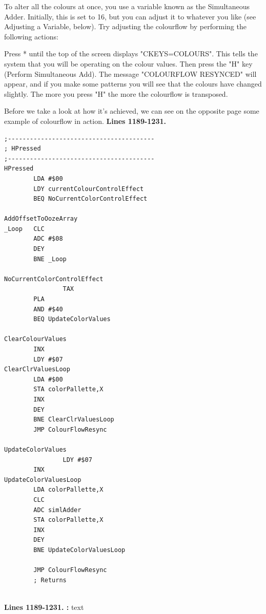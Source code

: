 \begin{definition}
To alter all the colours at once, you use a variable known as the Simultaneous
Adder.  Initially, this is set to 16, but you can adjust it to whatever you
like (see Adjusting a Variable, below).  Try adjusting the colourflow by
performing the following actions:

Press * until the top of the screen displays "CKEYS=COLOURS".  This tells the
system that you will be operating on the colour values.  Then press the "H" key
(Perform Simultaneous Add).  The message "COLOURFLOW RESYNCED" will appear, and
if you make some patterns you will see that the colours have changed slightly.
  The more you press "H" the more the colourflow is transposed.

\end{definition}
\clearpage


\clearpage
Before we take a look at how it's achieved, we can see on the opposite page
some example of colourflow in action.
\clearpage
\textbf{Lines 1189-1231. } 
\begin{lstlisting}
;----------------------------------------
; HPressed   
;----------------------------------------
HPressed   
        LDA #$00
        LDY currentColourControlEffect
        BEQ NoCurrentColorControlEffect

AddOffsetToOozeArray
_Loop   CLC 
        ADC #$08
        DEY 
        BNE _Loop

NoCurrentColorControlEffect   
				TAX 
        PLA 
        AND #$40
        BEQ UpdateColorValues

ClearColourValues
        INX 
        LDY #$07
ClearClrValuesLoop   
        LDA #$00
        STA colorPallette,X
        INX 
        DEY 
        BNE ClearClrValuesLoop
        JMP ColourFlowResync

UpdateColorValues   
				LDY #$07
        INX 
UpdateColorValuesLoop
        LDA colorPallette,X
        CLC 
        ADC simlAdder
        STA colorPallette,X
        INX 
        DEY 
        BNE UpdateColorValuesLoop

        JMP ColourFlowResync
        ; Returns


\end{lstlisting}
\clearpage

\textbf{Lines 1189-1231. :} 
text
\clearpage

